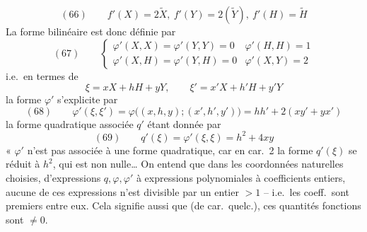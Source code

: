 \documentclass[11pt,a4paper]{article}
\begin{document}

\[
  (66) \qquad f'(X) = 2\tilde{X} ,\ f'(Y) = 2(\tilde{Y}) ,\ f'(H) = \tilde{H}
\]
La forme bilinéaire   est
donc définie par
\[
  (67) \qquad
  \begin{cases}
    \varphi'(X, X) = \varphi'(Y, Y) = 0 & \varphi'(H, H) = 1 \\
    \varphi'(X, H) = \varphi'(Y, H) = 0 & \varphi'(X, Y) = 2
  \end{cases}
\]
i.e.\ en termes de
\[
  \xi = xX + hH + yY , \qquad \xi' = x'X + h'H + y'Y
\]
la forme $\varphi'$ s'explicite par
\[
  (68) \qquad \varphi'(\xi, \xi') = \varphi\bigl((x, h, y); (x', h', y')\bigr) = hh' + 2(xy' + yx')
\]
la forme quadratique associée $q'$ étant donnée par
\[
  (69) \qquad q'(\xi) = \varphi'(\xi, \xi) = h^2 + 4xy
\]
\struck{\ill{}} «  $\varphi'$ n'est pas
associée à une forme quadratique, \struck{\ill{}} car en car.\ 2 la forme $q'(\xi)$
se réduit à $h^2$, qui est non nulle\ldots{} On entend que dans les coordonnées
naturelles choisies, \ill{} d'expressions $q, \varphi, \varphi'$ \ill{} à
\add{\ill{}} expressions polynomiales à coefficients entiers, aucune de ces
expressions n'est divisible par un entier $> 1$ -- i.e.\ les coeff.\ sont premiers
entre eux. Cela signifie aussi que \struck{\ill{}}  (de car.\ quelc.), ces quantités fonctions sont $\neq 0$.
\end{document}
